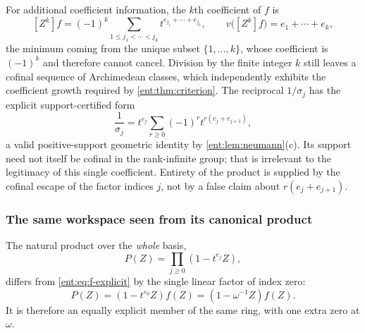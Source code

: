 \documentclass[11pt]{article}
\theoremstyle{plain}
\theoremstyle{plain}
\theoremstyle{plain}
\theoremstyle{definition}
\theoremstyle{definition}
\theoremstyle{definition}
\theoremstyle{definition}
\theoremstyle{remark}
\begin{document}
For additional coefficient information, the $k$th coefficient of $f$ is
\[
 [Z^k]f=(-1)^k\sum_{1\le j_1<\cdots<j_k}
                         t^{e_{j_1}+\cdots+e_{j_k}},
 \qquad
 v\bigl([Z^k]f\bigr)=e_1+\cdots+e_k,
\]
the minimum coming from the unique subset $\{1,\ldots,k\}$, whose coefficient
is $(-1)^k$ and therefore cannot cancel. Division by the finite integer $k$
still leaves a cofinal sequence of Archimedean classes, which independently
exhibits the coefficient growth required by \cref{ent:thm:criterion}. The
reciprocal $1/\sigma_j$ has the explicit support-certified form
\[
 \frac1{\sigma_j}
   =t^{e_j}\sum_{r\ge0}(-1)^r t^{r(e_j+e_{j+1})},
\]
a valid positive-support geometric identity by
\cref{ent:lem:neumann}(c). Its support need not itself be cofinal in the
rank-infinite group; that is irrelevant to the legitimacy of this single
coefficient. Entirety of the product is supplied by the cofinal escape of the
factor indices $j$, not by a false claim about $r(e_j+e_{j+1})$.

\subsubsection*{The same workspace seen from its canonical product}
The natural product over the \emph{whole} basis,
\begin{equation}\label{ent:eq:infinite-product}
 P(Z)=\prod_{j\ge0}(1-t^{e_j}Z),
\end{equation}
differs from \eqref{ent:eq:f-explicit} by the single linear factor of index
zero:
\begin{equation}\label{ent:eq:P-vs-f}
 P(Z)=(1-t^{e_0}Z)f(Z)=(1-\omega^{-1}Z)f(Z).
\end{equation}
It is therefore an equally explicit member of the same ring, with one extra
zero at $\omega$.
\end{document}
